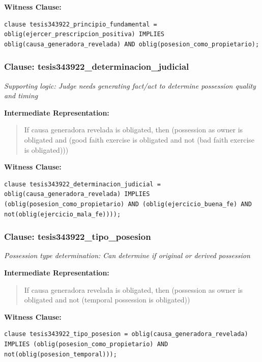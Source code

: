 \documentclass[11pt,a4paper]{article}
\begin{document}
\textbf{Witness Clause:}

\begin{lstlisting}[style=witnessstyle, language=Witness]
clause tesis343922_principio_fundamental = oblig(ejercer_prescripcion_positiva) IMPLIES oblig(causa_generadora_revelada) AND oblig(posesion_como_propietario);
\end{lstlisting}

\subsubsection{Clause: tesis343922\_determinacion\_judicial}

\textit{Supporting logic: Judge needs generating fact/act to determine possession quality and timing}

\textbf{Intermediate Representation:}

\begin{quote}
If causa generadora revelada is obligated, then (possession as owner is obligated and (good faith exercise is obligated and not (bad faith exercise is obligated)))
\end{quote}

\textbf{Witness Clause:}

\begin{lstlisting}[style=witnessstyle, language=Witness]
clause tesis343922_determinacion_judicial = oblig(causa_generadora_revelada) IMPLIES (oblig(posesion_como_propietario) AND (oblig(ejercicio_buena_fe) AND not(oblig(ejercicio_mala_fe))));
\end{lstlisting}

\subsubsection{Clause: tesis343922\_tipo\_posesion}

\textit{Possession type determination: Can determine if original or derived possession}

\textbf{Intermediate Representation:}

\begin{quote}
If causa generadora revelada is obligated, then (possession as owner is obligated and not (temporal possession is obligated))
\end{quote}

\textbf{Witness Clause:}

\begin{lstlisting}[style=witnessstyle, language=Witness]
clause tesis343922_tipo_posesion = oblig(causa_generadora_revelada) IMPLIES (oblig(posesion_como_propietario) AND not(oblig(posesion_temporal)));
\end{lstlisting}
\end{document}
